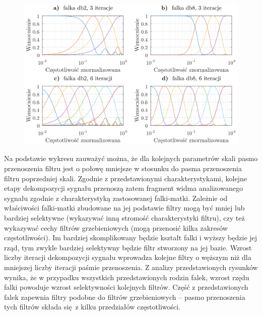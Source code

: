 \begin{figure}[htb!]
\begin{center}
\includegraphics{obrazki/bank_db_demo}
\end{center}
\end{figure}

Na podstawie wykresu zauważyć można, że dla kolejnych parametrów skali pasmo przenoszenia filtru jest o połowę mniejsze w stosunku do pasma przenoszenia filtru poprzedniej skali. Zgodnie z przedstawionymi charakterystykami, kolejne etapy dekompozycji sygnału przenoszą zatem fragment widma analizowanego sygnału zgodnie z charakterystyką zastosowanej falki-matki. Zależnie od właściwości falki-matki zbudowane na jej podstawie filtry mogą być mniej lub bardziej selektywne (wykazywać inną stromość charakterystyki filtru), czy też wykazywać cechy filtrów grzebieniowych (mogą przenosić kilka zakresów częstotliwości). Im bardziej skomplikowany będzie kształt falki i wyższy będzie jej rząd, tym zwykle bardziej selektywny będzie filtr stworzony na jej bazie. Wzrost liczby iteracji dekompozycji sygnału wprowadza kolejne filtry o węższym niż dla mniejszej liczby iteracji paśmie przenoszenia. Z analizy przedstawionych rysunków wynika, że w przypadku wszystkich przedstawionych rodzin falek, wzrost rzędu falki powoduje wzrost selektywności kolejnych filtrów. Część z przedstawionych falek zapewnia filtry podobne do filtrów grzebieniowych -- pasmo przenoszenia tych filtrów składa się z kilku przedziałów częstotliwości.

